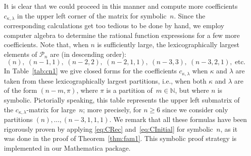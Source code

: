 \documentclass[10pt,oneside,american]{amsart}
\numberwithin{equation}{section}
\numberwithin{figure}{section}
\theoremstyle{plain}
\theoremstyle{definition}
\theoremstyle{remark}
\theoremstyle{plain}
\theoremstyle{definition}
\theoremstyle{plain}
\theoremstyle{plain}
\begin{document}
It is clear that we could proceed in this manner and compute more coefficients
$c_{\kappa,\lambda}$ in the upper left corner of the matrix for symbolic~$n$.
Since the corresponding calculations get too tedious to be done by hand, we
employ computer algebra to determine the rational function expressions for a
few more coefficients.  Note that, when $n$ is sufficiently large, the
lexicographically largest elements of $\mathcal{P}_n$ are (in descending
order): %
\[
  (n), \; (n-1,1), \; (n-2,2), \; (n-2,1,1), \; (n-3,3), \; (n-3,2,1), \; \text{etc.}
\]
In Table~\ref{tab:cn1} we give closed forms for the coefficients
$c_{\kappa,\lambda}$ when $\kappa$ and $\lambda$ are taken from these
lexicographically largest partitions, i.e., when both $\kappa$ and $\lambda$
are of the form $(n-m,\pi)$, where $\pi$ is a partition of~$m\in\mathbb{N}$,
but where $n$ is symbolic.  Pictorially speaking, this table represents the
upper left submatrix of the $c_{\kappa,\lambda}$-matrix for large~$n$; more
precisely, for $n\geq6$ since we consider only partitions
$(n),\dots,(n-3,1,1,1)$. We remark that all these formulas have been
rigorously proven by applying \eqref{eq:CRec} and~\eqref{eq:CInitial} for
symbolic~$n$, as it was done in the proof of Theorem~\ref{thm:fam1}. This
symbolic proof strategy is implemented in our Mathematica package.
\end{document}
